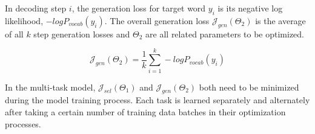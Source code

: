 In decoding step $i$, the generation loss for target word $y_{i}$ is its negative log likelihood, $-logP_{vocab}(y_{i})$. The overall generation loss $\mathcal{J}_{gen}(\Theta_{2})$ is the average of all $k$ step generation losses and $\Theta_{2}$ are all related parameters to be optimized.

\begin{equation}
\mathcal{J}_{gen}(\Theta_{2}) = \frac{1}{k}\sum_{i=1}^{k} -logP_{vocab}(y_{i})
\end{equation}

In the multi-task model, $\mathcal{J}_{sel}(\Theta_{1})$ and $\mathcal{J}_{gen}(\Theta_{2})$ both need to be minimized during the model training process. Each task is learned separately and alternately after taking a certain number of training data batches in their optimization processes.